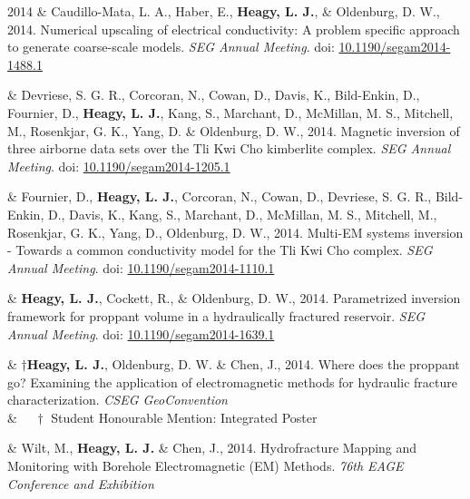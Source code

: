 \documentclass[a4paper, 11pt]{article}
\newcommand{\doi}[1]{doi: \href{https://doi.org/#1}{#1}}
\begin{document}
\begin{entryright}
2014 & Caudillo-Mata, L. A., Haber, E., \textbf{Heagy, L. J.}, \& Oldenburg, D. W., 2014. Numerical upscaling of electrical conductivity: A problem specific approach to generate coarse-scale models. \emph{SEG Annual Meeting}. \doi{10.1190/segam2014-1488.1}
\end{entryright}

\begin{entryright}
& Devriese, S. G. R., Corcoran, N., Cowan, D., Davis, K., Bild-Enkin, D., Fournier, D., \textbf{Heagy, L. J.}, Kang, S., Marchant, D., McMillan, M. S., Mitchell, M., Rosenkjar, G. K., Yang, D. \& Oldenburg, D. W., 2014. Magnetic inversion of three airborne data sets over the Tli Kwi Cho kimberlite complex. \emph{SEG Annual Meeting}. \doi{10.1190/segam2014-1205.1}
\end{entryright}

\begin{entryright}
& Fournier, D., \textbf{Heagy, L. J.}, Corcoran, N., Cowan, D., Devriese, S. G. R., Bild-Enkin, D., Davis, K., Kang, S., Marchant, D., McMillan, M. S., Mitchell, M., Rosenkjar, G. K., Yang, D., Oldenburg, D. W., 2014. Multi-EM systems inversion - Towards a common conductivity model for the Tli Kwi Cho complex. \emph{SEG Annual Meeting}. \doi{10.1190/segam2014-1110.1}
\end{entryright}

\begin{entryright}
& \textbf{Heagy, L. J.}, Cockett, R., \& Oldenburg, D. W., 2014. Parametrized inversion framework for proppant volume in a hydraulically fractured reservoir. \emph{SEG Annual Meeting}. \doi{10.1190/segam2014-1639.1}
\end{entryright}

\begin{entryright}
& $\dagger$\textbf{Heagy, L. J.}, Oldenburg, D. W. \& Chen, J., 2014. Where does the proppant go? Examining the application of electromagnetic methods for hydraulic fracture characterization. \emph{CSEG GeoConvention} \\
& $\quad \dagger$ Student Honourable Mention: Integrated Poster
\end{entryright}

\begin{entryright}
& Wilt, M., \textbf{Heagy, L. J.} \& Chen, J., 2014. Hydrofracture Mapping and Monitoring with Borehole Electromagnetic (EM) Methods. \emph{76th EAGE Conference and Exhibition}
\end{entryright}
\end{document}
